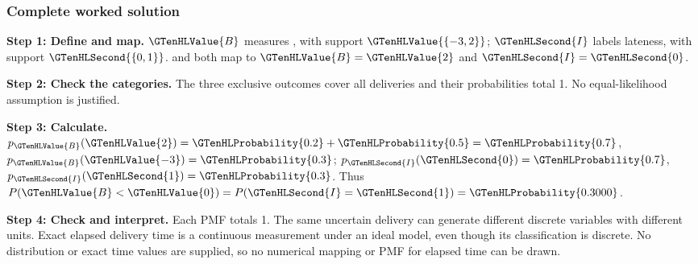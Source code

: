 \subsubsection*{Complete worked solution}
\label{subsubsec:t2-c1-delivery-records-two-numerical-descriptions-solution}
\par\noindent\begin{minipage}{\linewidth}
\textbf{Step 1: Define and map.} $\GTenHLValue{B}$ measures , with support $\GTenHLValue{\{-3,2\}}$; $\GTenHLSecond{I}$ labels lateness, with support $\GTenHLSecond{\{0,1\}}$.  and  both map to $\GTenHLValue{B}=\GTenHLValue{2}$ and $\GTenHLSecond{I}=\GTenHLSecond{0}$.
\end{minipage}\par\medskip
\par\noindent\begin{minipage}{\linewidth}
\textbf{Step 2: Check the categories.} The three exclusive outcomes cover all deliveries and their probabilities total 1. No equal-likelihood assumption is justified.
\end{minipage}\par\medskip
\par\noindent\begin{minipage}{\linewidth}
\textbf{Step 3: Calculate.} $p_{\GTenHLValue{B}}(\GTenHLValue{2})=\GTenHLProbability{0.2}+\GTenHLProbability{0.5}=\GTenHLProbability{0.7}$, $p_{\GTenHLValue{B}}(\GTenHLValue{-3})=\GTenHLProbability{0.3}$; $p_{\GTenHLSecond{I}}(\GTenHLSecond{0})=\GTenHLProbability{0.7}$, $p_{\GTenHLSecond{I}}(\GTenHLSecond{1})=\GTenHLProbability{0.3}$. Thus $P(\GTenHLValue{B}<\GTenHLValue{0})=P(\GTenHLSecond{I}=\GTenHLSecond{1})=\GTenHLProbability{0.3000}$.
\end{minipage}\par\medskip
\par\noindent\begin{minipage}{\linewidth}
\textbf{Step 4: Check and interpret.} Each PMF totals 1. The same uncertain delivery can generate different discrete variables with different units. Exact elapsed delivery time is a continuous measurement under an ideal model, even though its  classification is discrete. No distribution or exact time values are supplied, so no numerical mapping or PMF for elapsed time can be drawn.
\end{minipage}\par\medskip

